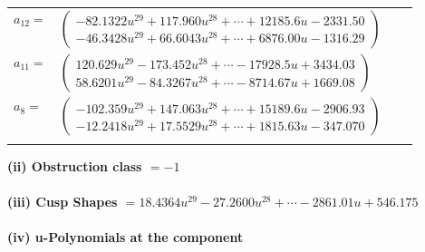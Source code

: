 \documentclass[1p]{elsarticle_modified}
\theoremstyle{definition}
\begin{document}
\begin{tabular}{m{7pt} m{180pt} m{7pt} m{180pt} }
\flushright $a_{12}=$&$\begin{pmatrix}-82.1322 u^{29}+117.960 u^{28}+\cdots+12185.6 u-2331.50\\-46.3428 u^{29}+66.6043 u^{28}+\cdots+6876.00 u-1316.29\end{pmatrix}$ \\
\flushright $a_{11}=$&$\begin{pmatrix}120.629 u^{29}-173.452 u^{28}+\cdots-17928.5 u+3434.03\\58.6201 u^{29}-84.3267 u^{28}+\cdots-8714.67 u+1669.08\end{pmatrix}$ \\
\flushright $a_{8}=$&$\begin{pmatrix}-102.359 u^{29}+147.063 u^{28}+\cdots+15189.6 u-2906.93\\-12.2418 u^{29}+17.5529 u^{28}+\cdots+1815.63 u-347.070\end{pmatrix}$\\&\end{tabular}
\flushleft \textbf{(ii) Obstruction class $= -1$}\\~\\
\flushleft \textbf{(iii) Cusp Shapes $= 18.4364 u^{29}-27.2600 u^{28}+\cdots-2861.01 u+546.175$}\\~\\
\newpage\renewcommand{\arraystretch}{1}
\flushleft \textbf{(iv) u-Polynomials at the component}\newline \\
\end{document}
